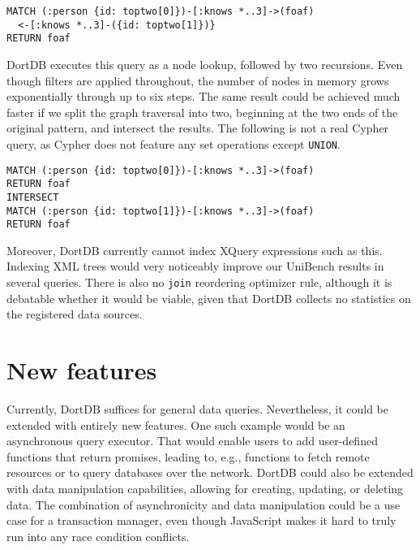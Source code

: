 \begin{verbatim}
MATCH (:person {id: toptwo[0]})-[:knows *..3]->(foaf)
  <-[:knows *..3]-({id: toptwo[1]})}
RETURN foaf
\end{verbatim}

DortDB executes this query as a node lookup, followed by two recursions. Even though filters are applied throughout, the number of nodes in memory grows exponentially through up to six steps. The same result could be achieved much faster if we split the graph traversal into two, beginning at the two ends of the original pattern, and intersect the results. The following is not a real Cypher query, as Cypher does not feature any set operations except \texttt{UNION}.

\begin{verbatim}
MATCH (:person {id: toptwo[0]})-[:knows *..3]->(foaf)
RETURN foaf
INTERSECT
MATCH (:person {id: toptwo[1]})-[:knows *..3]->(foaf)
RETURN foaf
\end{verbatim}

Moreover, DortDB currently cannot index XQuery expressions such as this. 
Indexing XML trees would very noticeably improve our UniBench results in several queries. There is also no \texttt{join} reordering optimizer rule, although it is debatable whether it would be viable, given that DortDB collects no statistics on the registered data sources.

\section{New features}

Currently, DortDB suffices for general data queries. Nevertheless, it could be extended with entirely new features. One such example would be an asynchronous query executor. That would enable users to add user-defined functions that return promises, leading to, e.g., functions to fetch remote resources or to query databases over the network. DortDB could also be extended with data manipulation capabilities, allowing for creating, updating, or deleting data. The combination of asynchronicity and data manipulation could be a use case for a transaction manager, even though JavaScript makes it hard to truly run into any race condition conflicts.